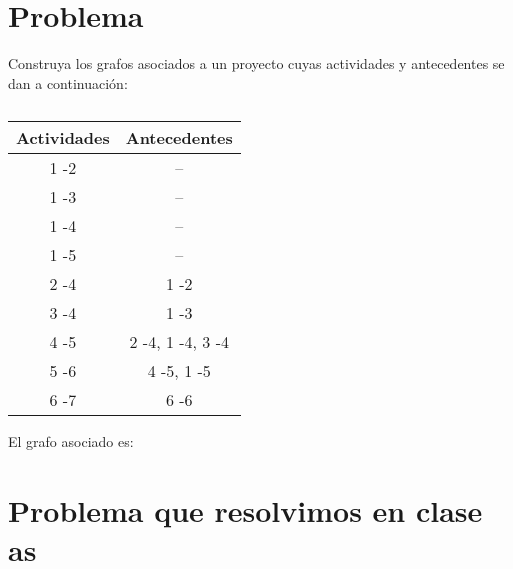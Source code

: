 \documentclass[autocontact]{gaceta}
\begin{document}
\section{Problema}
        Construya los grafos asociados a un proyecto cuyas actividades y antecedentes se dan a 
        continuación:
        \begin{table}[h]
            \begin{center}
            
                
            
                \begin{tabular}{|c|c|}
                    \hline
                    Actividades & Antecedentes \\
                    \hline
                    1 -2 & -- \\
                    \hline
                    1 -3 & -- \\
                    \hline
                    1 -4 & -- \\
                    \hline
                    1 -5 & -- \\
                    \hline
                    2 -4 & 1 -2 \\
                    \hline
                    3 -4 & 1 -3 \\
                    \hline 
                    4 -5 & 2 -4, 1 -4, 3 -4 \\
                    \hline 
                    5 -6 & 4 -5, 1 -5 \\
                    \hline
                    6 -7 & 6 -6                    \\
                    \hline                      
                
                \end{tabular}   
            
            \end{center}
            \caption{}
        \end{table}

        El grafo asociado es:

        

\section{Problema que resolvimos en clase as}
   



\end{document}
